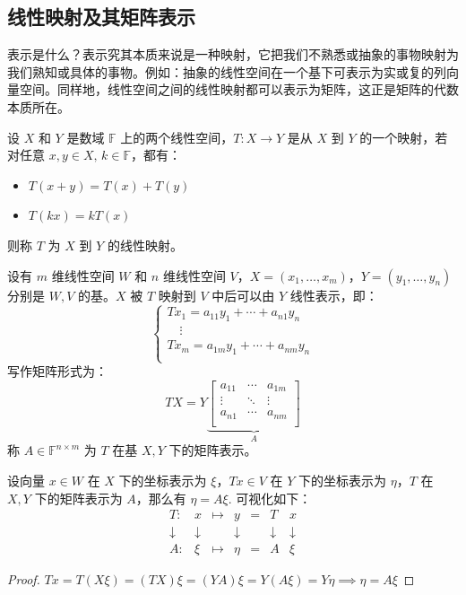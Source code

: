 \subsection{线性映射及其矩阵表示}

表示是什么？表示究其本质来说是一种映射，它把我们不熟悉或抽象的事物映射为我们熟知或具体的事物。例如：抽象的线性空间在一个基下可表示为实或复的列向量空间。同样地，线性空间之间的线性映射都可以表示为矩阵，这正是矩阵的代数本质所在。

\begin{definition}[线性映射]
设 $X$ 和 $Y$ 是数域 $\mathbb F$ 上的两个线性空间，$T:X\to Y$ 是从 $X$ 到 $Y$ 的一个映射，若对任意 $x,y\in X,\,k\in \mathbb F$，都有：
\begin{itemize}
    \item $T(x+y)=T(x)+T(y)$
    \item $T(kx)=kT(x)$
\end{itemize}
则称 $T$ 为 $X$ 到 $Y$ 的线性映射。
\end{definition}

\begin{definition}[线性映射的矩阵表示]
\label{def:matrixrepr}
设有 $m$ 维线性空间 $W$ 和 $n$ 维线性空间 $V$，$X=(x_1,\ldots,x_m)$，$Y=(y_1,\ldots,y_n)$ 分别是 $W,V$ 的基。$X$ 被 $T$ 映射到 $V$ 中后可以由 $Y$ 线性表示，即：
\[
\begin{cases}
Tx_1=a_{11}y_1+\cdots+a_{n1}y_n\\
\quad\vdots\\
Tx_m=a_{1m}y_1+\cdots+a_{nm}y_n\\
\end{cases}
\]
写作矩阵形式为：
\[
    TX=Y
    \underbrace{\begin{bmatrix}
    a_{11}&\cdots&a_{1m}\\
    \vdots&\ddots&\vdots\\
    a_{n1}&\cdots&a_{nm}\\
    \end{bmatrix}}_A
\]
称 $A\in\mathbb F^{n\times m}$ 为 $T$ 在基 $X,Y$ 下的矩阵表示。
\end{definition}

\begin{theorem}[向量在不同基下的坐标表示的关系]
设向量 $x\in W$ 在 $X$ 下的坐标表示为 $\xi$，$Tx\in V$ 在 $Y$ 下的坐标表示为 $\eta$，$T$ 在 $X,Y$ 下的矩阵表示为 $A$，那么有 $\eta=A\xi$. 可视化如下：
\[
\begin{array}{ccccccc}
    T: & x   & \mapsto & y    & = & T & x   \\
    \downarrow & \downarrow & & \downarrow & & \downarrow & \downarrow \\
    A: & \xi & \mapsto & \eta & = & A & \xi
\end{array}
\]
\end{theorem}
\begin{proof}
$Tx=T(X\xi)=(TX)\xi=(YA)\xi=Y(A\xi)=Y\eta\implies \eta=A\xi$
\end{proof}

